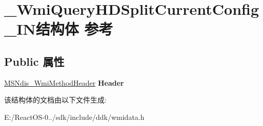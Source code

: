 \hypertarget{struct___wmi_query_h_d_split_current_config___i_n}{}\section{\+\_\+\+Wmi\+Query\+H\+D\+Split\+Current\+Config\+\_\+\+I\+N结构体 参考}
\label{struct___wmi_query_h_d_split_current_config___i_n}
\subsection*{Public 属性}
\begin{DoxyCompactItemize}
\item 
\mbox{\label{struct___wmi_query_h_d_split_current_config___i_n_a16f014b49d0029a1c56d7aeffebd319e}} 
\hyperlink{struct___m_s_ndis___wmi_method_header}{M\+S\+Ndis\+\_\+\+Wmi\+Method\+Header} {\bfseries Header}
\end{DoxyCompactItemize}


该结构体的文档由以下文件生成\+:\begin{DoxyCompactItemize}
\item 
E\+:/\+React\+O\+S-\/0../sdk/include/ddk/wmidata.\+h\end{DoxyCompactItemize}
